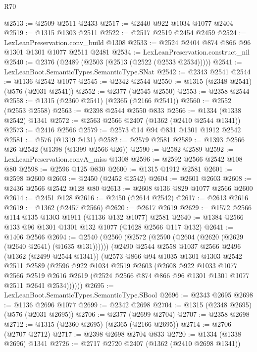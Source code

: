 \begin{lexlean}{R70}
\begin{coremodule}
@2513 := @2509 @2511 @2433
@2517 := @2440 @922 @1034 @1077 @2404
@2519 := @1315 @1303 @2511
@2522 := @2517 @2519 @2454 @2459
@2524 := LexLeanPreservation.conv_build @1308
@2533 := @2524 @2404 @874 @866 @96 @1301 @1301 @1077 @2511 @2481
@2534 := LexLeanPreservation.construct_nil
@2540 := @2376 (@2489 (@2503 (@2513 (@2522 (@2533 @2534)))))
@2541 := LexLeanBoot.SemanticTypes.SemanticType.SNat
@2542 := @2343 @2541
@2544 := @1136 @2542 @1077
@2545 := @2342 @2544
@2550 := @1315 (@2348 @2541) (@576 (@2031 @2541))
@2552 := @2377 (@2545 @2550)
@2553 := @2358 @2544
@2558 := @1315 (@2360 @2541) (@2365 (@2166 @2541))
@2560 := @2552 (@2553 @2558)
@2563 := @2398 @2544 @2550 @833
@2566 := @1334 (@1338 @2542) @1341
@2572 := @2563 @2566 @2407 (@1362 (@2410 @2544 @1341))
@2573 := @2416 @2566
@2579 := @2573 @14 @94 @831 @1301 @1912 @2542
@2581 := @576 (@1319 @131)
@2582 := @2579 @2581
@2589 := @1393 @2566 @26 @2542 (@1398 (@1399 @2566 @26))
@2590 := @2582 @2589
@2592 := LexLeanPreservation.convA_miss @1308
@2596 := @2592 @2566 @2542 @108 @80
@2598 := @2596 @125 @830
@2600 := @1315 @1912 @2581
@2601 := @2598 @2600
@2603 := @2450 (@2452 @2542)
@2604 := @2601 @2603
@2608 := @2436 @2566 @2542 @128 @80
@2613 := @2608 @136 @829 @1077 @2566 @2600
@2614 := @2451 @128
@2616 := @2450 (@2614 @2542)
@2617 := @2613 @2616
@2619 := @1362 (@2457 @2566)
@2620 := @2617 @2619
@2629 := @1572 @2566 @114 @135 @1303 @1911 (@1136 @132 @1077) @2581
@2640 := @1384 @2566 @133 @96 @1301 @1301 @132 @1077 (@1628 @2566 @117 @132)
@2641 := @1406 @2566
@2694 := @2540
    (@2560
      (@2572 (@2590 (@2604 (@2620 (@2629 (@2640 @2641) (@1635 @131))))))
      (@2490
        @2544
        @2558
        @1037
        @2566
        @2496
        (@1362 (@2499 @2544 @1341))
        (@2573
          @866
          @94
          @1035
          @1301
          @1303
          @2542
          @2511
          @2589
          (@2596
            @922
            @1034
            @2519
            @2603
            (@2608
              @922
              @1033
              @1077
              @2566
              @2519
              @2616
              @2619
              (@2524 @2566 @874 @866 @96 @1301 @1301 @1077 @2511 @2641 @2534))))))
@2695 := LexLeanBoot.SemanticTypes.SemanticType.SBool
@2696 := @2343 @2695
@2698 := @1136 @2696 @1077
@2699 := @2342 @2698
@2704 := @1315 (@2348 @2695) (@576 (@2031 @2695))
@2706 := @2377 (@2699 @2704)
@2707 := @2358 @2698
@2712 := @1315 (@2360 @2695) (@2365 (@2166 @2695))
@2714 := @2706 (@2707 @2712)
@2717 := @2398 @2698 @2704 @833
@2720 := @1334 (@1338 @2696) @1341
@2726 := @2717 @2720 @2407 (@1362 (@2410 @2698 @1341))

\end{coremodule}
\end{lexlean}

